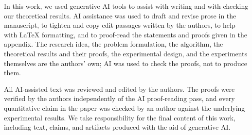 \documentclass{article} %
\begin{document}
In this work, we used generative AI tools to assist with writing and with checking our
theoretical results. AI assistance was used to draft and revise prose in the manuscript, to
tighten and copy-edit passages written by the authors, to help with \LaTeX{} formatting, and to
proof-read the statements and proofs given in the appendix. The research idea, the problem
formulation, the algorithm, the theoretical results and their proofs, the experimental design,
and the experiments themselves are the authors' own; AI was used to check the proofs, not to
produce them.

All AI-assisted text was reviewed and edited by the authors. The proofs were verified by the
authors independently of the AI proof-reading pass, and every quantitative claim in the paper
was checked by an author against the underlying experimental results. We take responsibility
for the final content of this work, including text, claims, and artifacts produced with the aid
of generative AI.





\end{document}
